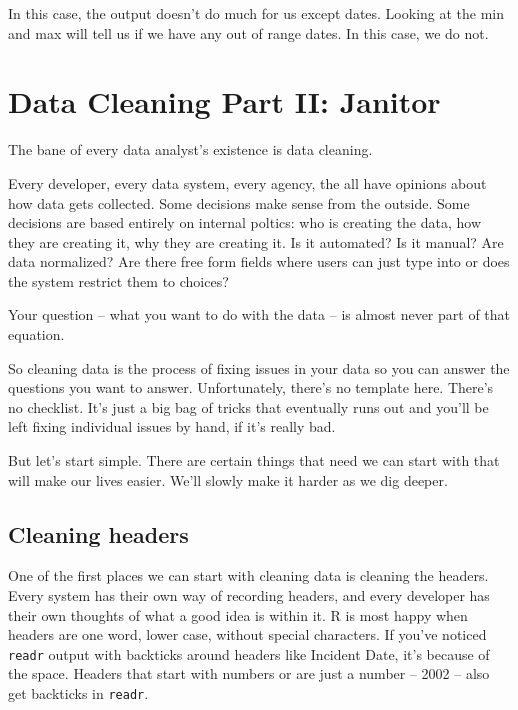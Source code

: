 \documentclass[]{book}
\begin{document}
In this case, the output doesn't do much for us except dates. Looking at the min and max will tell us if we have any out of range dates. In this case, we do not.

\hypertarget{data-cleaning-part-ii-janitor}{%
\chapter{Data Cleaning Part II: Janitor}\label{data-cleaning-part-ii-janitor}}

The bane of every data analyst's existence is data cleaning.

Every developer, every data system, every agency, the all have opinions about how data gets collected. Some decisions make sense from the outside. Some decisions are based entirely on internal poltics: who is creating the data, how they are creating it, why they are creating it. Is it automated? Is it manual? Are data normalized? Are there free form fields where users can just type into or does the system restrict them to choices?

Your question -- what you want to do with the data -- is almost never part of that equation.

So cleaning data is the process of fixing issues in your data so you can answer the questions you want to answer. Unfortunately, there's no template here. There's no checklist. It's just a big bag of tricks that eventually runs out and you'll be left fixing individual issues by hand, if it's really bad.

But let's start simple. There are certain things that need we can start with that will make our lives easier. We'll slowly make it harder as we dig deeper.

\hypertarget{cleaning-headers}{%
\section{Cleaning headers}\label{cleaning-headers}}

One of the first places we can start with cleaning data is cleaning the headers. Every system has their own way of recording headers, and every developer has their own thoughts of what a good idea is within it. R is most happy when headers are one word, lower case, without special characters. If you've noticed \texttt{readr} output with backticks around headers like Incident Date, it's because of the space. Headers that start with numbers or are just a number -- 2002 -- also get backticks in \texttt{readr}.
\end{document}
